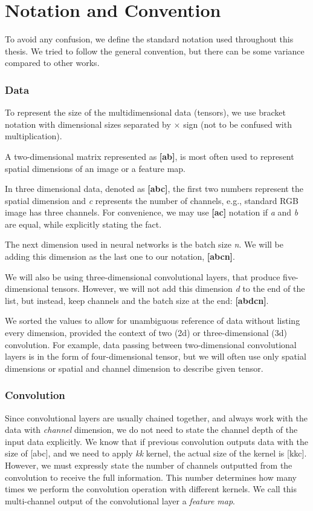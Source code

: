 \section{Notation and Convention}
\label{sec:notation}
To avoid any confusion, we define the standard notation used throughout this thesis. We tried to follow the general convention, but there can be some variance compared to other works.

\subsubsection*{Data}

To represent the size of the multidimensional data (tensors), we use bracket notation with dimensional sizes separated by $\times $ sign (not to be confused with multiplication).

A two-dimensional matrix represented as \textbf{[a\x b]}, is most often used to represent spatial dimensions of an image or a feature map. 

In three dimensional data, denoted as \textbf{[a\x b\x c]}, the first two numbers represent the spatial dimension and \textit{c} represents the number of channels, e.g., standard RGB image has three channels. For convenience, we may use \textbf{[a\x c]} notation if \textit{a} and \textit{b} are equal, while explicitly stating the fact.

The next dimension used in neural networks is the batch size \textit{n}. We will be adding this dimension as the last one to our notation, \textbf{[a\x b\x c\x n]}.

We will also be using three-dimensional convolutional layers, that produce five-dimensional tensors. However, we will not add this dimension \textit{d} to the end of the list, but instead, keep channels and the batch size at the end: \textbf{[a\x b\x d\x c\x n]}. 

We sorted the values to allow for unambiguous reference of data without listing every dimension, provided the context of two (2d) or three-dimensional (3d) convolution. For example, data passing between two-dimensional convolutional layers is in the form of four-dimensional tensor, but we will often use only spatial dimensions or spatial and channel dimension to describe given tensor.

\subsubsection*{Convolution}
Since convolutional layers are usually chained together, and always work with the data with \textit{channel} dimension, we do not need to state the channel depth of the input data explicitly. We know that if previous convolution outputs data with the size of [a\x b\x c], and we need to apply \textit{k\x k} kernel, the actual size of the kernel is [k\x k\x c]. However, we must expressly state the number of channels outputted from the convolution to receive the full information. This number determines how many times we perform the convolution operation with different kernels. We call this multi-channel output of the convolutional layer a \textit{feature map}.

